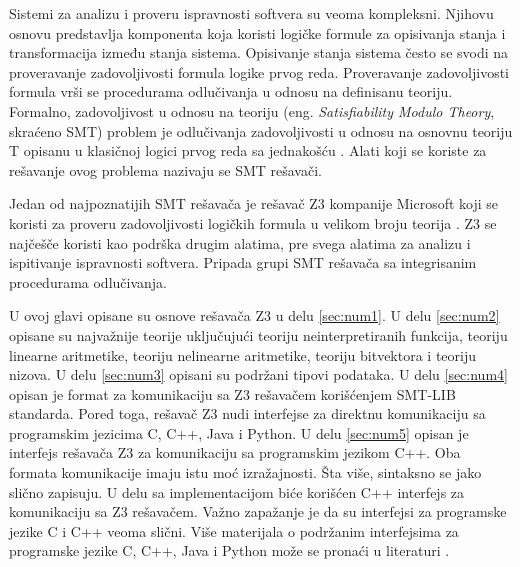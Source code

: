 \documentclass[12pt,oneside]{memoir}
\begin{document}
Sistemi za analizu i proveru ispravnosti softvera su veoma kompleksni. Njihovu osnovu predstavlja komponenta koja koristi logičke formule za opisivanja stanja i transformacija između stanja sistema. Opisivanje stanja sistema često se svodi na proveravanje zadovoljivosti formula logike prvog reda. 
Proveravanje zadovoljivosti formula vrši se procedurama odlučivanja u odnosu na definisanu teoriju. Formalno, zadovoljivost u odnosu na teoriju (eng. \textit{Satisfiability Modulo Theory}, skraćeno SMT) problem je odlučivanja zadovoljivosti u odnosu na osnovnu teoriju T opisanu u klasičnoj logici prvog reda sa jednakošću \cite{Barrett}. Alati koji se koriste za rešavanje ovog problema nazivaju se SMT rešavači. 
\par

Jedan od najpoznatijih SMT rešavača je rešavač Z3 kompanije Microsoft koji se koristi za proveru zadovoljivosti logičkih formula u velikom broju teorija \cite{EfficientSMTSolver}. Z3 se najčešče koristi kao podrška drugim alatima, pre svega alatima za analizu i ispitivanje ispravnosti softvera. Pripada grupi SMT rešavača sa integrisanim procedurama odlučivanja.
\par
U ovoj glavi opisane su osnove rešavača Z3 u delu \ref{sec:num1}. U delu \ref{sec:num2} opisane su najvažnije teorije uključujući teoriju neinterpretiranih funkcija, teoriju linearne aritmetike, teoriju nelinearne aritmetike, teoriju bitvektora i teoriju nizova. U delu \ref{sec:num3} opisani su  podržani tipovi podataka. U delu \ref{sec:num4} opisan je format za komunikaciju sa Z3 rešavačem korišćenjem SMT-LIB standarda. Pored toga, rešavač Z3 nudi interfejse za direktnu komunikaciju sa programskim jezicima C, C++, Java i Python. U delu \ref{sec:num5} opisan je interfejs rešavača Z3 za komunikaciju sa programskim jezikom C++. Oba formata komunikacije imaju istu moć izražajnosti. Šta više, sintaksno se jako slično zapisuju. U delu sa implementacijom biće korišćen C++ interfejs za komunikaciju sa Z3 rešavačem. Važno zapažanje je da su interfejsi za programske jezike C i C++ veoma slični. Više materijala o podržanim interfejsima za programske jezike C, C++, Java i Python može se pronaći u literaturi \cite{api}.
\end{document}
